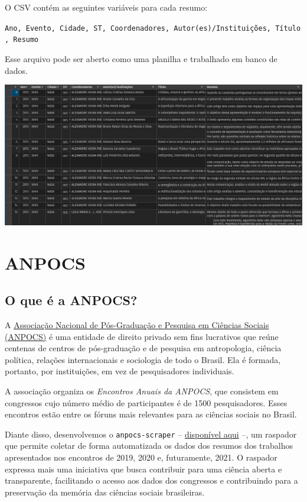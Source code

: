 \documentclass[
]{book}
\begin{document}
O CSV contém as seguintes variáveis para cada resumo:

\texttt{Ano,\ Evento,\ Cidade,\ ST,\ Coordenadores,\ Autor(es)/Instituições,\ Título,\ Resumo}

Esse arquivo pode ser aberto como uma planilha e trabalhado em banco de dados.

\includegraphics{img/ex_csv2.png}

\hypertarget{anpocs}{%
\chapter{ANPOCS}\label{anpocs}}

\hypertarget{o-que-uxe9-a-anpocs}{%
\section{O que é a ANPOCS?}\label{o-que-uxe9-a-anpocs}}

A \href{http://anpocs.com/}{Associação Nacional de Pós-Graduação e Pesquisa em Ciências Sociais (ANPOCS)} é uma entidade de direito privado sem fins lucrativos que reúne centenas de centros de pós-graduação e de pesquisa em antropologia, ciência política, relações internacionais e sociologia de todo o Brasil. Ela é formada, portanto, por instituições, em vez de pesquisadores individuais.

A associação organiza os \emph{Encontros Anuais da ANPOCS}, que consistem em congressos cujo número médio de participantes é de 1500 pesquisadores. Esses encontros estão entre os fóruns mais relevantes para as ciências sociais no Brasil.

Diante disso, desenvolvemos o \texttt{anpocs-scraper} -- \href{https://github.com/vmussa/anpocs-scraper}{disponível aqui} --, um raspador que permite coletar de forma automatizada os dados dos resumos dos trabalhos apresentados nos encontros de 2019, 2020 e, futuramente, 2021. O raspador expressa mais uma iniciativa que busca contribuir para uma ciência aberta e transparente, facilitando o acesso aos dados dos congressos e contribuindo para a preservação da memória das ciências sociais brasileiras.
\end{document}
